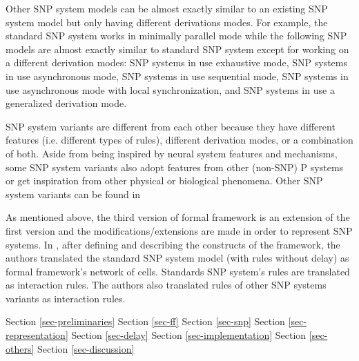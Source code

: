 \documentclass[a4paper]{article}
\theoremstyle{definition}
\begin{document}
Other SNP system models can be almost exactly similar to an existing SNP system model but only 
having different derivations modes. For example, the standard SNP system works in minimally parallel
mode while the following SNP models are almost exactly similar to standard SNP system except for 
working on a different derivation modes:  SNP systems in \cite{ionescu-2007-exhaustive} use 
exhaustive mode, SNP systems in \cite{cavaliere-2009-asynchronous} use asynchronous mode, SNP 
systems in \cite{ibarra-2009-min-max-sequential} use sequential mode, SNP systems in 
\cite{song-2013-local-sync} use asynchronous mode with local synchronization, and SNP systems in                                 
\cite{zhang-2014-general-rule-use,jiang-2019-improved-usnp-general-rule-use} use a generalized       
derivation mode.

SNP system variants are different from each other because they have different features (i.e. 
different types of rules), different derivation modes, or a combination of both. Aside from being 
inspired by neural system features and mechanisms, some SNP system variants also adopt features from 
other (non-SNP) P systems or get inspiration from other physical or biological phenomena. Other 
SNP system variants can be found in                                                                                      
\cite{chen-2008-snp-e,alhazov-2006-esnp,chen-2007-axon-p,pan-2009-anti-spikes,song-2014-rules-on-synapses,metta-2014-cooperating-rules,wu-2016-cell-like,song-2016-request-rules,pan-2017-communication-on-request,song-2018-colored-spikes}  

As mentioned above, the third version of formal framework \cite{verlan-2020-ff-3} is an extension of 
the first version and the modifications/extensions are made in order to represent SNP systems. In 
\cite{verlan-2020-ff-3}, after defining and describing the constructs of the framework, the authors 
translated the standard SNP system model (with rules without delay) as formal framework's network of 
cells. Standards SNP system's rules are translated as interaction rules. The authors also translated
 rules of other SNP systems variants
\cite{chen-2008-snp-e,pan-2012-weighted-synapses,alhazov-2006-esnp,peng-2017-multiple-channels,pan-2012-astrocytes} 
as interaction rules.  

Section \ref{sec-preliminaries}
Section \ref{sec-ff}
Section \ref{sec-snp}
Section \ref{sec-representation}
Section \ref{sec-delay}
Section \ref{sec-implementation}
Section \ref{sec-others}
Section \ref{sec-discussion}
\end{document}

